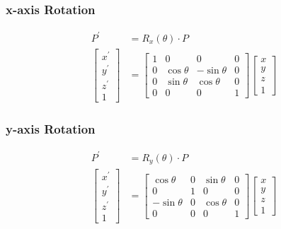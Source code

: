 \subsubsection{x-axis Rotation}

$$
\begin{aligned}
  P^\prime &= R_x(\theta) \cdot P \\
  \begin{bmatrix}
    x^\prime \\
    y^\prime \\
    z^\prime \\
    1
  \end{bmatrix}
  &=
  \begin{bmatrix}
    1 & 0 & 0 & 0 \\
    0 & \cos \theta & -\sin \theta & 0 \\
    0 & \sin \theta & \cos \theta & 0 \\
    0 & 0 & 0 & 1
  \end{bmatrix}
  \begin{bmatrix}
    x \\
    y \\
    z \\
    1
  \end{bmatrix}
\end{aligned}
$$

\subsubsection{y-axis Rotation}

$$
\begin{aligned}
  P^\prime &= R_y(\theta) \cdot P \\
  \begin{bmatrix}
    x^\prime \\
    y^\prime \\
    z^\prime \\
    1
  \end{bmatrix}
  &=
  \begin{bmatrix}
    \cos \theta & 0 & \sin \theta & 0 \\
    0 & 1 & 0 & 0 \\
    -\sin \theta & 0 & \cos \theta & 0 \\
    0 & 0 & 0 & 1
  \end{bmatrix}
  \begin{bmatrix}
    x \\
    y \\
    z \\
    1
  \end{bmatrix}
\end{aligned}
$$

